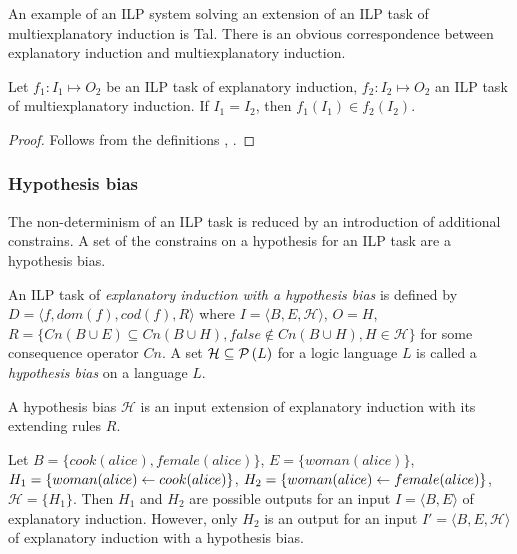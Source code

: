An example of an ILP system solving an extension of an ILP task of multiexplanatory induction is Tal. There is an obvious correspondence between explanatory induction and multiexplanatory induction.

\begin{proposition}
Let $f_1:I_1 \mapsto O_2$ be an ILP task of explanatory induction, $f_2:I_2 \mapsto O_2$ an ILP task of multiexplanatory induction. If $I_1=I_2$, then
$f_1(I_1) \in f_2(I_2)$.
\end{proposition}

\begin{proof}
Follows from the definitions , .
\end{proof}

\subsubsection{Hypothesis bias}
The non-determinism of an ILP task is reduced by an introduction of additional constrains. A set of the constrains on a hypothesis for an ILP task are a hypothesis bias.

\begin{defn}
An ILP task of \emph{explanatory induction with a hypothesis bias} is defined by $D=\langle f, dom(f), cod(f), R \rangle$ where $I=\langle B, E, \mathcal{H}\rangle$, $O=H$,
$R=\{Cn(B \cup E) \subseteq Cn(B \cup H), false \not\in Cn(B \cup H), H \in \mathcal{H}\}$ for some consequence operator $Cn$. A set $\mathcal{H} \subseteq \mathcal{P} \left({ L }\right)$ for a logic language $L$ is called a \emph{hypothesis bias} on a language $L$.
\end{defn}

\begin{remark}
A hypothesis bias $\mathcal{H}$ is an input extension of explanatory induction with its extending rules $R$.
\end{remark}

\begin{exmp}\label{explanatory_induction_hypothesis_bias}
Let $B = \{cook(alice), female(alice)\}$, $E=\{woman(alice)\}$,
$H_1=\{woman(alice) \leftarrow cook(alice)\}$,
$H_2=\{woman(alice) \leftarrow female(alice)\}$,
$\mathcal{H}=\{H_1\}$.
Then $H_1$ and $H_2$ are possible outputs for an input $I=\langle B, E\rangle$ of explanatory induction. However, only $H_2$ is an output for an input $I'=\langle B, E, \mathcal{H}\rangle$ of explanatory induction with a hypothesis bias.
\end{exmp}

